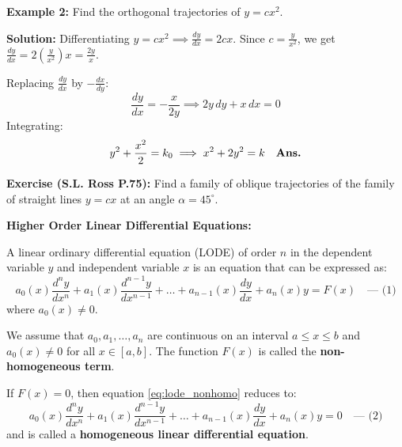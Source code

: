 \documentclass[11pt,a4paper]{article}
\newcommand{\Heading}[1]{\vspace{0.3cm}\noindent\textbf{\textcolor{AcademicGreen}{\large #1}}\par\vspace{0.15cm}}
\begin{document}
\vspace{0.3cm}
\begin{tcolorbox}[greenbox]
    \textbf{\textcolor{AcademicGreen}{Example 2:}} Find the orthogonal trajectories of $y = cx^2$.
    
    \vspace{0.15cm}
    \noindent\textbf{Solution:} Differentiating $y = cx^2 \implies \frac{dy}{dx} = 2cx$.
    Since $c = \frac{y}{x^2}$, we get $\frac{dy}{dx} = 2\left(\frac{y}{x^2}\right)x = \frac{2y}{x}$.
    
    \noindent Replacing $\frac{dy}{dx}$ by $-\frac{dx}{dy}$:
    \[
    \frac{dy}{dx} = -\frac{x}{2y} \implies 2y \, dy + x \, dx = 0
    \]
    Integrating:
    \[
    y^2 + \frac{x^2}{2} = k_0 \implies x^2 + 2y^2 = k \quad \text{\textbf{Ans.}}
    \]
\end{tcolorbox}

\vspace{0.2cm}
\noindent\textbf{Exercise (S.L. Ross P.75):} Find a family of oblique trajectories of the family of straight lines $y = cx$ at an angle $\alpha = 45^\circ$.

\newpage

\Heading{Higher Order Linear Differential Equations:}
A linear ordinary differential equation (LODE) of order $n$ in the dependent variable $y$ and independent variable $x$ is an equation that can be expressed as:
\begin{equation}
    a_0(x)\frac{d^n y}{dx^n} + a_1(x)\frac{d^{n-1}y}{dx^{n-1}} + \dots + a_{n-1}(x)\frac{dy}{dx} + a_n(x)y = F(x) \quad \text{--- (1)} \label{eq:lode_nonhomo}
\end{equation}
where $a_0(x) \neq 0$.

\vspace{0.15cm}
\noindent We assume that $a_0, a_1, \dots, a_n$ are continuous on an interval $a \le x \le b$ and $a_0(x) \neq 0$ for all $x \in [a,b]$.
The function $F(x)$ is called the \textbf{non-homogeneous term}.

\vspace{0.2cm}
\noindent If $F(x) = 0$, then equation \eqref{eq:lode_nonhomo} reduces to:
\begin{equation}
    a_0(x)\frac{d^n y}{dx^n} + a_1(x)\frac{d^{n-1}y}{dx^{n-1}} + \dots + a_{n-1}(x)\frac{dy}{dx} + a_n(x)y = 0 \quad \text{--- (2)} \label{eq:lode_homo}
\end{equation}
and is called a \textbf{homogeneous linear differential equation}.
\end{document}
